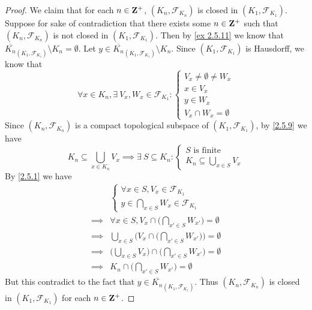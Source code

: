 \begin{proof}
  We claim that for each \(n \in \mathbf{Z}^+\), \((K_n, \mathcal{F}_{K_n})\) is closed in \((K_1, \mathcal{F}_{K_1})\).
  Suppose for sake of contradiction that there exists some \(n \in \mathbf{Z}^+\) such that \((K_n, \mathcal{F}_{K_n})\) is not closed in \((K_1, \mathcal{F}_{K_1})\).
  Then by \cref{ex 2.5.11} we know that \(\overline{K_n}_{(K_1, \mathcal{F}_{K_1})} \setminus K_n = \emptyset\).
  Let \(y \in \overline{K_n}_{(K_1, \mathcal{F}_{K_1})} \setminus K_n\).
  Since \((K_1, \mathcal{F}_{K_1})\) is Hausdorff, we know that
  \[
    \forall x \in K_n, \exists\ V_x, W_x \in \mathcal{F}_{K_1} : \begin{cases}
      V_x \neq \emptyset \neq W_x \\
      x \in V_x                   \\
      y \in W_x                   \\
      V_x \cap W_x = \emptyset
    \end{cases}
  \]
  Since \((K_n, \mathcal{F}_{K_n})\) is a compact topological subspace of \((K_1, \mathcal{F}_{K_1})\), by \cref{2.5.9} we have
  \[
    K_n \subseteq \bigcup_{x \in K_n} V_x \implies \exists\ S \subseteq K_n : \begin{cases}
      S \text{ is finite} \\
      K_n \subseteq \bigcup_{x \in S} V_x
    \end{cases}
  \]
  By \cref{2.5.1} we have
  \begin{align*}
             & \begin{cases}
                 \forall x \in S, V_x \in \mathcal{F}_{K_1} \\
                 y \in \bigcap_{x \in S} W_x \in \mathcal{F}_{K_1}
               \end{cases}                                         \\
    \implies & \forall x \in S, V_x \cap \bigg(\bigcap_{x' \in S} W_{x'}\bigg) = \emptyset              \\
    \implies & \bigcup_{x \in S} \Bigg(V_x \cap \bigg(\bigcap_{x' \in S} W_{x'}\bigg)\Bigg) = \emptyset \\
    \implies & \bigg(\bigcup_{x \in S} V_x\bigg) \cap \bigg(\bigcap_{x' \in S} W_{x'}\bigg) = \emptyset \\
    \implies & K_n \cap \bigg(\bigcap_{x' \in S} W_{x'}\bigg) = \emptyset
  \end{align*}
  But this contradict to the fact that \(y \in \overline{K_n}_{(K_1, \mathcal{F}_{K_1})}\).
  Thus \((K_n, \mathcal{F}_{K_n})\) is closed in \((K_1, \mathcal{F}_{K_1})\) for each \(n \in \mathbf{Z}^+\).


\end{proof}
